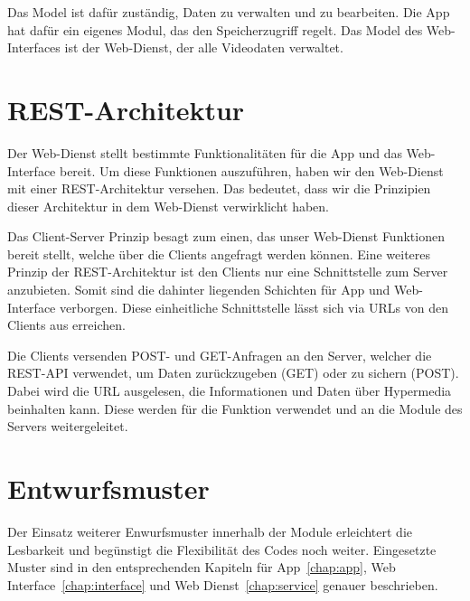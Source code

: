 Das Model ist dafür zuständig, Daten zu verwalten und zu bearbeiten. Die App hat dafür ein eigenes Modul, das den Speicherzugriff regelt. Das Model des Web-Interfaces ist der Web-Dienst, der alle Videodaten verwaltet.\newline\par

\section{REST-Architektur} \label{allg:Rest}

Der Web-Dienst stellt bestimmte Funktionalitäten für die App und das Web-Interface bereit. Um diese Funktionen auszuführen, haben wir den Web-Dienst mit einer REST-Architektur versehen. Das bedeutet, dass wir die Prinzipien dieser Architektur in dem Web-Dienst verwirklicht haben.\newline

Das Client-Server Prinzip besagt zum einen, das unser Web-Dienst Funktionen bereit stellt, welche über die Clients angefragt werden können. Eine weiteres Prinzip der REST-Architektur ist den Clients nur eine Schnittstelle zum Server anzubieten. Somit sind die dahinter liegenden Schichten für App und Web-Interface verborgen. Diese einheitliche Schnittstelle lässt sich via URLs von den Clients aus erreichen.\newline

Die Clients versenden POST- und GET-Anfragen an den Server, welcher die REST-API verwendet, um Daten zurückzugeben (GET) oder zu sichern (POST). Dabei wird die URL ausgelesen, die Informationen und Daten über Hypermedia beinhalten kann. Diese werden für die Funktion verwendet und an die Module des Servers weitergeleitet.\newline

\section{Entwurfsmuster} \label{allg:Entwurfsmuster}
Der Einsatz weiterer Enwurfsmuster innerhalb der Module erleichtert die Lesbarkeit und begünstigt die Flexibilität des Codes noch weiter. Eingesetzte Muster sind in den entsprechenden Kapiteln für App~\eqref{chap:app}, Web Interface~\eqref{chap:interface} und Web Dienst~\eqref{chap:service} genauer beschrieben.